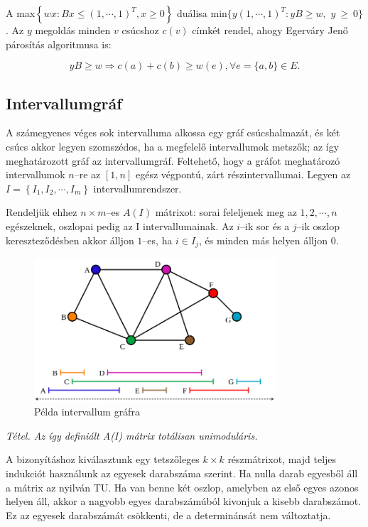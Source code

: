 A max$\left\{ wx : Bx \leq (1,\cdots,1)^T, x \geq 0 \right\}$ duálisa
min$\{ y(1,\cdots,1)^T : yB \geq w,$ $y~\geq~0\}$. Az $y$ megoldás
minden $v$ csúcshoz $c(v)$ címkét rendel, ahogy Egerváry Jenő párosítás
algoritmusa is:

\[ yB \geq w \Rightarrow c(a) + c(b) \geq w(e), \forall e=\{a,b\}\in E.\]

\subsection{Intervallumgráf}

A számegyenes véges sok intervalluma alkossa egy gráf csúcshalmazát, és két
csúcs akkor legyen szomszédos, ha a megfelelő intervallumok metszők; az így
meghatározott gráf az intervallumgráf. Feltehető, hogy a gráfot meghatározó
intervallumok $n$--re az $[1,n]$ egész végpontú, zárt részintervallumai.
Legyen az $I=\left\{I_1, I_2, \cdots, I_m\right\}$ intervallumrendszer.

Rendeljük ehhez $n \times m$--es $A(I)$ mátrixot: sorai feleljenek meg az
$1,2,\cdots,n$ egészeknek, oszlopai pedig az I intervallumainak. Az $i$--ik sor
és a $j$--ik oszlop kereszteződésben akkor álljon $1$--es, ha $i \in I_j$, és
minden más helyen álljon $0$.

\begin{figure}[htbp]
\centering
\includegraphics[width=0.8\textwidth]{./kepek/intervalum_graf.png}
\caption{Példa intervallum gráfra} \label{fig:int_graf}
\end{figure}

\emph{Tétel. Az így definiált A(I) mátrix totálisan unimoduláris.}
\vspace{0.4cm}

A bizonyításhoz kiválasztunk egy tetszőleges $k \times k$ részmátrixot, majd
teljes indukciót használunk az egyesek darabszáma szerint. Ha nulla darab
egyesből áll a mátrix az nyilván TU. Ha van benne két oszlop, amelyben az első
egyes azonos helyen áll, akkor a nagyobb egyes darabszámúból kivonjuk a kisebb
darabszámot. Ez az egyesek darabszámát csökkenti, de a determinánsát nem
változtatja.

